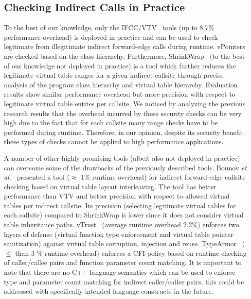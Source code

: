 \subsection{Checking Indirect Calls in Practice}
\label{C++ Indirect Calls in Practice}
To the best of our knowledge, only the IFCC/VTV~\cite{vtv:tice} tools (up to 8.7\% performance overhead) is deployed in practice
and can be used to check legitimate from illegitimate indirect forward-edge calls during runtime. vPointers are checked based on the class hierarchy. 
Furthermore, ShrinkWrap~\cite{haller:shrinkwrap} (to the best of our knowledge not deployed in practice) is a tool which further reduces the legitimate 
virtual table ranges for a given indirect callsite through precise analysis of the program class hierarchy and virtual table hierarchy. Evaluation results
show similar performance overhead but more precision with respect to legitimate virtual table entries per callsite. We noticed by analyzing the previous 
research results that the overhead incurred by these security checks can be very high due to the fact that for each callsite many range checks have to be
performed during runtime. Therefore, in our opinion, despite its security benefit these types of checks cannot be applied to high performance applications.

A number of other highly promising tools (albeit also not deployed in practice) can overcome some of the drawbacks of the previously described tools. 
Bounov \textit{et al.}~\cite{bounov:interleaving} presented a tool ($\approx$ 1\% runtime overhead)
for indirect forward-edge callsite checking based on virtual table layout interleaving. The tool has better performance than VTV and better precision with
respect to allowed virtual tables per indirect callsite. Its precision (selecting legitimate virtual tables for each callsite) compared to ShrinkWrap is
lower since it does not consider virtual table inheritance paths. vTrust~\cite{zhang:vtrust} (average runtime overhead 2.2\%) enforces two layers of defense
(virtual function type enforcement and virtual table pointer sanitization) against virtual table corruption, injection and reuse. TypeArmor~\cite{veen:typearmor}
($\le$ than 3 \% runtime overhead) enforces a CFI-policy based on runtime checking of caller/callee pairs and function parameter count matching. It is important to note 
that there are no C++ language semantics which can be used to enforce type and parameter count matching for indirect caller/callee pairs, this could be addressed
with specifically intended language constructs in the future.



